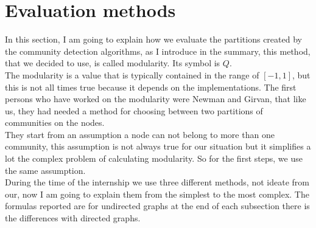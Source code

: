 %
%
%
\chapter{Evaluation methods}
In this section, I am going to explain how we evaluate the partitions created by the community detection algorithms, as I introduce in the summary, this method, that we decided to use, is called modularity. Its symbol is $Q$.\\
The modularity is a value that is typically contained in the range of $[-1, 1]$, but this is not all times true because it depends on the implementations. The first persons who have worked on the modularity were Newman and Girvan, that like us, they had needed a method for choosing between two partitions of communities on the nodes.\\
They start from an assumption a node can not belong to more than one community, this assumption is not always true for our situation but it simplifies a lot the complex problem of calculating modularity. So for the first steps, we use the same assumption.\\
During the time of the internship we use three different methods, not ideate from our, now I am going to explain them from the simplest to the most complex. The formulas reported are for undirected graphs at the end of each subsection there is the differences with directed graphs.
%
%
